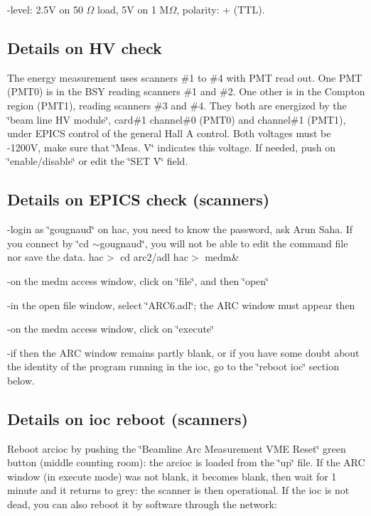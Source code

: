 -level: 2.5V on 50 $\Omega$ load, 5V on 1 M$\Omega$, polarity: + (TTL). 


\subsection{Details on HV check }

The energy measurement uses scanners \#1 to \#4 with PMT read out. One PMT (PMT0)
is in the BSY reading scanners \#1 and \#2. One other is in the Compton region
(PMT1), reading scanners \#3 and \#4. They both are energized by the \char`\"{}beam
line HV module\char`\"{}, card\#1 channel\#0 (PMT0) and channel\#1 (PMT1), under
EPICS control of the general Hall A control. Both voltages must be -1200V, make
sure that \char`\"{}Meas. V\char`\"{} indicates this voltage. If needed, push
on \char`\"{}enable/disable\char`\"{} or edit the \char`\"{}SET V\char`\"{}
field. 


\subsection{Details on EPICS check (scanners) }

-login as \char`\"{}gougnaud\char`\"{} on hac, you need to know the password,
ask Arun Saha. If you connect by \char`\"{}cd \( \sim  \)gougnaud\char`\"{},
you will not be able to edit the command file nor save the data. hac$>$ cd arc2/adl
hac$>$ medm\& 

-on the medm access window, click on \char`\"{}file\char`\"{}, and then \char`\"{}open\char`\"{} 

-in the open file window, select \char`\"{}ARC6.adl\char`\"{}; the ARC window
must appear then 

-on the medm access window, click on \char`\"{}execute\char`\"{} 

-if then the ARC window remains partly blank, or if you have some doubt about
the identity of the program running in the ioc, go to the \char`\"{}reboot ioc\char`\"{}
section below. 


\subsection{Details on ioc reboot (scanners) }

Reboot arcioc by pushing the \char`\"{}Beamline Arc Measurement VME Reset\char`\"{}
green button (middle counting room): the arcioc is loaded from the \char`\"{}up\char`\"{}
file. If the ARC window (in execute mode) was not blank, it becomes blank, then
wait for 1 minute and it returns to grey: the scanner is then operational. If the
ioc is not dead, you can also reboot it by software through the network: 

